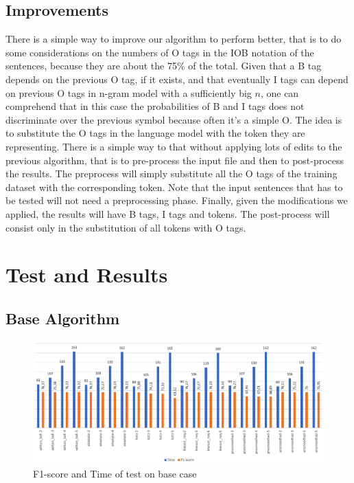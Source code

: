 \documentclass[11pt,a4paper]{article}
\begin{document}
\subsection{Improvements}

There is a simple way to improve our algorithm to perform better, that is to do some considerations on the numbers of O tags in the IOB notation of the sentences, because they are about the 75\% of the total. Given that a B tag depends on the previous O tag, if it exists, and that eventually I tags can depend on previous O tags in n-gram model with a sufficiently big $n$, one can comprehend that in this case the probabilities of B and I tags does not discriminate over the previous symbol because often it's a simple O. The idea is to substitute the O tags in the language model with the token they are representing. There is a simple way to that without applying lots of edits to the previous algorithm, that is to pre-process the input file and then to post-process the results. The preprocess will simply substitute all the O tags of the training dataset with the corresponding token. Note that the input sentences that has to be tested will not need a preprocessing phase. Finally, given the modifications we applied, the results will have B tags, I tags and tokens. The post-process will consist only in the substitution of all tokens with O tags.

\section{Test and Results}

\subsection{Base Algorithm}

\begin{figure}
  \includegraphics[width=\textwidth]{test_base.png}
  \caption{F1-score and Time of test on base case}
\end{figure}
\end{document}
